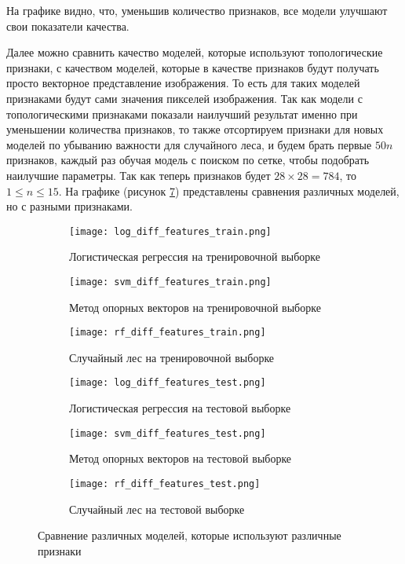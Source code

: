 На графике видно, что, уменьшив количество признаков, все модели улучшают свои показатели качества. 

Далее можно сравнить качество моделей, которые используют топологические признаки, с качеством моделей, которые в качестве признаков будут получать просто векторное представление изображения. То есть для таких моделей признаками будут сами значения пикселей изображения. Так как модели с топологическими признаками показали наилучший результат именно при уменьшении количества признаков, то также отсортируем признаки для новых моделей по убыванию важности для случайного леса, и будем брать первые $50n$ признаков, каждый раз обучая модель с поиском по сетке, чтобы подобрать наилучшие параметры. Так как теперь признаков будет $28 \times 28 = 784$, то $1 \leq n \leq 15$. На графике (рисунок \ref{accuracies_diff_features}) представлены сравнения различных моделей, но с разными признаками. 

\begin{figure}[!htbp]
	    \centering %
	\begin{subfigure}{0.25\textwidth}
		\texttt{[image: log\_diff\_features\_train.png]}
		\caption{Логистическая регрессия на тренировочной выборке}
		\label{fig:1}
	\end{subfigure}\hfil %
	\begin{subfigure}{0.25\textwidth}
		\texttt{[image: svm\_diff\_features\_train.png]}
		\caption{Метод опорных векторов на тренировочной выборке}
		\label{fig:2}
	\end{subfigure}\hfil %
	\begin{subfigure}{0.25\textwidth}
		\texttt{[image: rf\_diff\_features\_train.png]}
		\caption{Случайный лес на тренировочной выборке}
		\label{fig:3}
	\end{subfigure}
	
	\medskip
	\begin{subfigure}{0.25\textwidth}
		\texttt{[image: log\_diff\_features\_test.png]}
		\caption{Логистическая регрессия на тестовой выборке}
		\label{fig:4}
	\end{subfigure}\hfil %
	\begin{subfigure}{0.25\textwidth}
		\texttt{[image: svm\_diff\_features\_test.png]}
		\caption{Метод опорных векторов на тестовой выборке}
		\label{fig:5}
	\end{subfigure}\hfil %
	\begin{subfigure}{0.25\textwidth}
		\texttt{[image: rf\_diff\_features\_test.png]}
		\caption{Случайный лес на тестовой выборке}
		\label{fig:6}
	\end{subfigure}
	\caption{Сравнение различных моделей, которые используют различные признаки}
	\label{accuracies_diff_features}
\end{figure}

